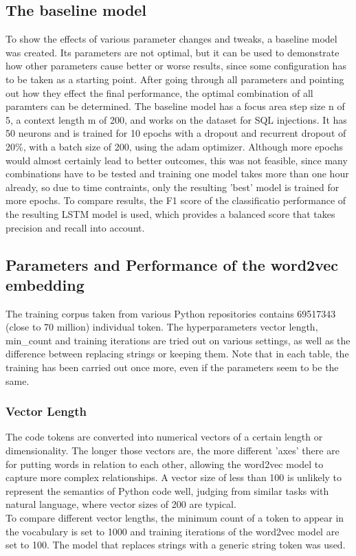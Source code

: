 \documentclass[
	a4paper,
	pagesize,
	pdftex,
	12pt,
	twoside, %
	BCOR=5mm, %
	ngerman,
	fleqn,
	final,
	]{scrartcl}
\begin{document}
\subsection{The baseline model}
To show the effects of various parameter changes and tweaks, a baseline model was created. Its parameters are not optimal, but it can be used to demonstrate how other parameters cause better or worse results, since some configuration has to be taken as a starting point. After going through all parameters and pointing out how they effect the final performance, the optimal combination of all paramters can be determined. The baseline model has a focus area step size n of 5, a context length m of 200, and works on the dataset for SQL injections. It has 50 neurons and is trained for 10 epochs with a dropout and recurrent dropout of 20\%, with a batch size of 200, using the adam optimizer. Although more epochs would almost certainly lead to better outcomes, this was not feasible, since many combinations have to be tested and training one model takes more than one hour already, so due to time contraints, only the resulting 'best' model is trained for more epochs. To compare results, the F1 score of the classificatio performance of the resulting LSTM  model is used, which provides a balanced score that takes precision and recall into account.

\subsection{Parameters and Performance of the word2vec embedding}

The training corpus taken from various Python repositories contains 69517343 (close to 70 million) individual token. The hyperparameters vector length, min\_count and training iterations are tried out on various settings, as well as the difference between replacing strings or keeping them. Note that in each table, the training has been carried out once more, even if the parameters seem to be the same.

\subsubsection{Vector Length}
The code tokens are converted into numerical vectors of a certain length or dimensionality. The longer those vectors are, the more different 'axes' there are for putting words in relation to each other, allowing the word2vec model to capture more complex relationships. A vector size of less than 100 is unlikely to represent the semantics of Python code well, judging from similar tasks with natural language, where vector sizes of 200 are typical.\\
To compare different vector lengths, the minimum count of a token to appear in the vocabulary is set to 1000 and training iterations of the word2vec model are set to 100. The model that replaces strings with a generic string token was used.
\end{document}
